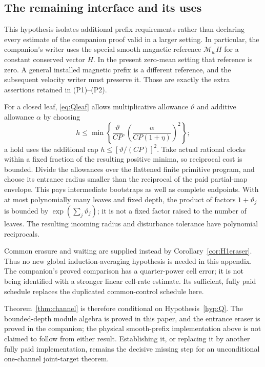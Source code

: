 \documentclass[11pt,a4paper]{amsart}
\theoremstyle{definition}
\theoremstyle{remark}
\numberwithin{equation}{section}
\newcommand{\Mcal}{\mathcal M}
\begin{document}
\subsection{The remaining interface and its uses}
This hypothesis isolates additional prefix requirements rather than declaring every estimate of the companion proof valid in a larger setting. In particular, the companion's writer uses the special smooth magnetic reference $\Mcal_w H$ for a constant conserved vector $H$. In the present zero-mean setting that reference is zero. A general installed magnetic prefix is a different reference, and the subsequent velocity writer must preserve it. Those are exactly the extra assertions retained in (P1)--(P2).

For a closed leaf, \eqref{eq:Qleaf} allows multiplicative allowance $\vartheta$ and additive allowance $\alpha$ by choosing
\[
 h\le\min\left\{\frac{\vartheta}{CP},
        \left(\frac{\alpha}{CP(1+\eta)}\right)^2\right\};
\]
a hold uses the additional cap $h\le[\vartheta/(CP)]^2$. Take actual rational clocks within a fixed fraction of the resulting positive minima, so reciprocal cost is bounded. Divide the allowances over the flattened finite primitive program, and choose its entrance radius smaller than the reciprocal of the paid partial-map envelope. This pays intermediate bootstraps as well as complete endpoints. With at most polynomially many leaves and fixed depth, the product of factors $1+\vartheta_j$ is bounded by $\exp(\sum_j\vartheta_j)$; it is not a fixed factor raised to the number of leaves. The resulting incoming radius and disturbance tolerance have polynomial reciprocals.

Common erasure and waiting are supplied instead by Corollary~\ref{cor:H1eraser}. Thus no new global induction-averaging hypothesis is needed in this appendix. The companion's proved comparison has a quarter-power cell error; it is not being identified with a stronger linear cell-rate estimate. Its sufficient, fully paid schedule replaces the duplicated common-control schedule here.

Theorem~\ref{thm:channel} is therefore conditional on Hypothesis~\ref{hyp:Q}. The bounded-depth module algebra is proved in this paper, and the entrance eraser is proved in the companion; the physical smooth-prefix implementation above is not claimed to follow from either result. Establishing it, or replacing it by another fully paid implementation, remains the decisive missing step for an unconditional one-channel joint-target theorem.
\end{document}
